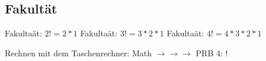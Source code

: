 \subsection{Fakultät}

Fakultaät: $2!=2*1$
Fakultaät: $3!=3*2*1$
Fakultaät: $4!=4*3*2*1$

Rechnen mit dem Taschenrechner: Math $\rightarrow\rightarrow\rightarrow$ PRB 4: !